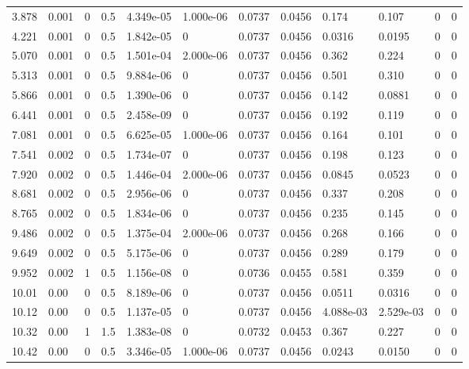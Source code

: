 \documentclass[preview]{standalone}
\begin{document}
{{\begin{tabular}{L{1.2cm}C{1.2cm} C{0.3cm}C{0.5cm} C{1.4cm}C{1.4cm} C{1.4cm}C{1.4cm} C{1.6cm}C{1.6cm} C{1.6cm}C{1.6cm}}
  3.878  &  0.001  & 0     & 0.5 &  4.349e-05  & 1.000e-06  &  0.0737&   0.0456& 0.174 & 0.107   &  0 & 0  \\ 
  4.221  &  0.001  & 0     & 0.5 &  1.842e-05  & 0  &  0.0737&   0.0456& 0.0316 & 0.0195   &  0 & 0  \\ 
  5.070  &  0.001  & 0     & 0.5 &  1.501e-04  & 2.000e-06  &  0.0737&   0.0456& 0.362 & 0.224   &  0 & 0  \\ 
  5.313  &  0.001  & 0     & 0.5 &  9.884e-06  & 0  &  0.0737&   0.0456& 0.501 & 0.310   &  0 & 0  \\ 
  5.866  &  0.001  & 0     & 0.5 &  1.390e-06  & 0  &  0.0737&   0.0456& 0.142 & 0.0881   &  0 & 0  \\ 
  6.441  &  0.001  & 0     & 0.5 &  2.458e-09  & 0  &  0.0737&   0.0456& 0.192 & 0.119   &  0 & 0  \\ 
  7.081  &  0.001  & 0     & 0.5 &  6.625e-05  & 1.000e-06  &  0.0737&   0.0456& 0.164 & 0.101   &  0 & 0  \\ 
  7.541  &  0.002  & 0     & 0.5 &  1.734e-07  & 0  &  0.0737&   0.0456& 0.198 & 0.123   &  0 & 0  \\ 
  7.920  &  0.002  & 0     & 0.5 &  1.446e-04  & 2.000e-06  &  0.0737&   0.0456& 0.0845 & 0.0523   &  0 & 0  \\ 
  8.681  &  0.002  & 0     & 0.5 &  2.956e-06  & 0  &  0.0737&   0.0456& 0.337 & 0.208   &  0 & 0  \\ 
  8.765  &  0.002  & 0     & 0.5 &  1.834e-06  & 0  &  0.0737&   0.0456& 0.235 & 0.145   &  0 & 0  \\ 
  9.486  &  0.002  & 0     & 0.5 &  1.375e-04  & 2.000e-06  &  0.0737&   0.0456& 0.268 & 0.166   &  0 & 0  \\ 
  9.649  &  0.002  & 0     & 0.5 &  5.175e-06  & 0  &  0.0737&   0.0456& 0.289 & 0.179   &  0 & 0  \\ 
  9.952  &  0.002  & 1     & 0.5 &  1.156e-08  & 0  &  0.0736&   0.0455& 0.581 & 0.359   &  0 & 0  \\ 
  10.01  &  0.00  & 0     & 0.5 &  8.189e-06  & 0  &  0.0737&   0.0456& 0.0511 & 0.0316   &  0 & 0  \\ 
  10.12  &  0.00  & 0     & 0.5 &  1.137e-05  & 0  &  0.0737&   0.0456& 4.088e-03 & 2.529e-03   &  0 & 0  \\ 
  10.32  &  0.00  & 1     & 1.5 &  1.383e-08  & 0  &  0.0732&   0.0453& 0.367 & 0.227   &  0 & 0  \\ 
  10.42  &  0.00  & 0     & 0.5 &  3.346e-05  & 1.000e-06  &  0.0737&   0.0456& 0.0243 & 0.0150   &  0 & 0  \\ 

\end{tabular}}}
\end{document}
